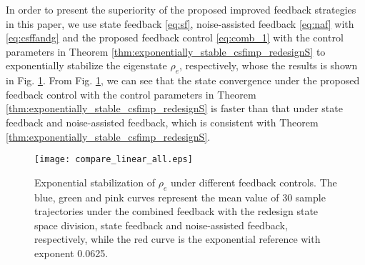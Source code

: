 \documentclass[]{elsarticle}
\begin{document}
In order to present the superiority of the proposed improved feedback strategies in this paper, we use state feedback \eqref{eq:sf}, noise-assisted feedback \eqref{eq:naf} with \eqref{eq:csffandg} and the proposed feedback control \eqref{eq:comb_1} with the control parameters in Theorem \ref{thm:exponentially_stable_csfimp_redesignS} to exponentially stabilize the eigenstate $\rho_e$, respectively, whose the results is shown in Fig. \ref{figur:Compare}. From Fig. \ref{figur:Compare}, we can see that the state convergence under the proposed feedback control with the control parameters in Theorem \ref{thm:exponentially_stable_csfimp_redesignS} is faster than that under state feedback and noise-assisted feedback, which is consistent with Theorem \ref{thm:exponentially_stable_csfimp_redesignS}.
\begin{figure}[!htbp]
	\centering
	\texttt{[image: compare\_linear\_all.eps]}
	\caption{Exponential stabilization of $\rho_{e}$ under different feedback controls. The blue, green and pink curves represent the mean value of 30 sample trajectories under the combined feedback with the redesign state space division, state feedback and noise-assisted feedback, respectively, while the red curve is the exponential reference with exponent 0.0625.}
	\label{figur:Compare}
\end{figure}

{}
\end{document}
